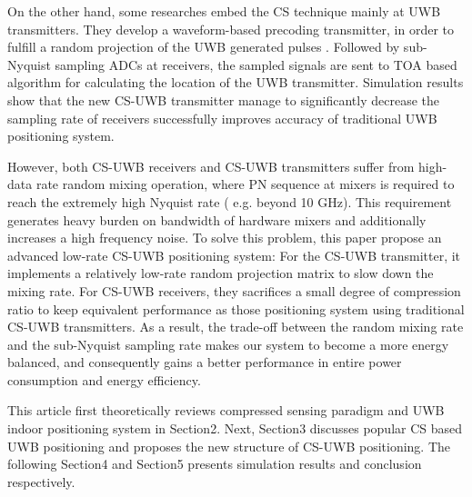 On the other hand, some researches embed the CS technique mainly at UWB transmitters. They develop a waveform-based precoding transmitter, in order to fulfill a random projection of the UWB generated pulses \cite{zhang2009compressed}. Followed by sub-Nyquist sampling ADCs at receivers, the sampled signals are sent to TOA based algorithm for calculating the location of the UWB transmitter. Simulation results show that the new CS-UWB transmitter manage to significantly decrease the sampling rate of receivers successfully improves accuracy of traditional UWB positioning system. 

However, both CS-UWB receivers and CS-UWB transmitters suffer from high-data rate random mixing operation, where PN sequence at mixers is required to reach the extremely high Nyquist rate ( e.g. beyond 10 GHz). This requirement generates heavy burden on bandwidth of hardware mixers and additionally increases a high frequency noise. To solve this problem, this paper propose an advanced low-rate CS-UWB positioning system: For the CS-UWB transmitter, it implements a relatively low-rate random projection matrix to slow down the mixing rate. For CS-UWB receivers, they sacrifices a small degree of compression ratio to keep equivalent performance as those positioning system using traditional CS-UWB transmitters. As a result, the trade-off between the random mixing rate and the sub-Nyquist sampling rate makes our system to become a more energy balanced, and consequently gains a better performance in entire power consumption and energy efficiency.  

This article first theoretically reviews compressed sensing paradigm and UWB indoor positioning system in Section2. Next, Section3 discusses popular CS based UWB positioning and proposes the new structure of CS-UWB positioning. The following Section4 and Section5 presents simulation results and conclusion respectively.    

